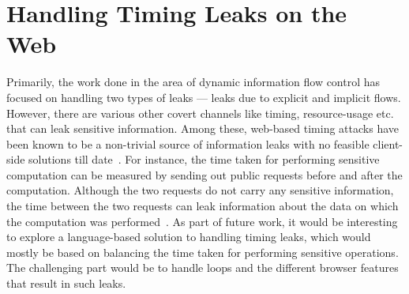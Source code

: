 \section{Handling Timing Leaks on the Web}
Primarily, the work done in the area of dynamic information flow
control has focused on handling two types of leaks ---
leaks due to explicit and implicit flows. However, there are various 
other covert channels like timing, resource-usage etc. that can leak
sensitive information. Among these, web-based timing attacks have been  
known to be a non-trivial source of information leaks with no feasible
client-side solutions till date~\cite{timing}. For instance, the time 
taken for performing sensitive computation can be measured by sending
out public requests before and after the computation. Although the two
requests do not carry any sensitive information, the time between the
two requests can leak information about the data on which the
computation was performed~\cite{timing}. As part of future work, it
would be interesting to explore a language-based solution to handling
timing leaks, which would mostly be based on balancing the time taken
for performing sensitive operations. The challenging part would be to 
handle loops and the different browser features that result in such
leaks. 

